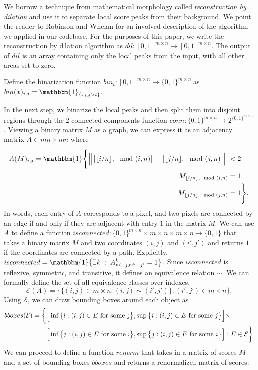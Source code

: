 \documentclass[10pt]{article}
\newcommand{\ind}[1]{\mathbbm{1}_{\left\{#1\right\}}}
\begin{document}
We borrow a technique from mathematical morphology called {\em reconstruction by dilation} and use it to separate local score peaks from their background.
We point the reader to Robinson and Whelan \citep{robinson2004efficient} for an involved description of the algorithm we applied in our codebase.
For the purposes of this paper, we write the reconstruction by dilation algorithm as $dil : [0,1]^{m \times n} \to [0,1]^{m \times n}$.
The output of $dil$ is an array containing only the local peaks from the input, with all other areas set to zero.

Define the binarization function $bin_t: [0,1]^{m \times n} \to \{0,1\}^{m \times n}$ as $bin(x)_{i,j}=\ind{x_{i,j}>t}$.

In the next step, we binarize the local peaks and then split them into disjoint regions through the $2$-connected-components function $conn:\{0,1\}^{m \times n} \to 2^{\{0,1\}^{m \times n}}$.
Viewing a binary matrix $M$ as a graph, we can express it as an adjacency matrix $A \in mn \times mn$ where 
\begin{align}
    A(M)_{i,j} = \mathbbm{1}
    \Bigg\{
        \Big|\Big|\big[ \lfloor i/n \rfloor, \mod (i,n) \big]-\big[ \lfloor j/n \rfloor, \mod (j,n) \big]\Big|\Big| & < 2 \\
        M_{\lfloor i/n \rfloor,\mod (i,n)} & = 1  \\
        M_{\lfloor j/n \rfloor,\mod (j,n)} & = 1 \Bigg\}.
\end{align}
In words, each entry of $A$ corresponds to a pixel, and two pixels are connected by an edge if and only if they are adjacent with entry $1$ in the matrix $M$.
We can use $A$ to define a function $isconnected : \{0,1\}^{m \times n} \times m \times n \times m \times n \to \{0,1\}$ that takes a binary matrix $M$ and two coordinates $(i,j)$ and $(i', j')$ and returns $1$ if the coordinates are connected by a path.
Explicitly, $isconnected = \mathbbm{1}\big\{ \exists k \; : \; A^k_{ni+j,ni'+j'} = 1\big\}$.
Since $isconnected$ is reflexive, symmetric, and transitive, it defines an equivalence relation $\sim$.
We can formally define the set of all equivalence classes over indexes,
\begin{equation}
    \mathcal{E}(A) = \Big\{ \big\{ (i,j) \in m \times n : (i,j) \sim (i',j') \big\} : (i', j') \in m \times n\Big\}.
\end{equation}
Using $\mathcal{E}$, we can draw bounding boxes around each object as
\begin{align}
    bboxes(\mathcal{E}) = \bigg\{ & \Big[ \inf\big\{i : (i,j) \in E \textnormal{ for some } j\big\}, \sup\big\{i : (i,j) \in E \textnormal{ for some } j\big\}\Big] \times \\ 
    & \Big[ \inf\big\{j : (i,j) \in E \textnormal{ for some } i\big\}, \sup\big\{j : (i,j) \in E \textnormal{ for some } i\big\}\Big] : E \in \mathcal{E} \bigg\}
\end{align}
We can proceed to define a function $renorm$ that takes in a matrix of scores $M$ and a set of bounding boxes $bboxes$ and returns a renormalized matrix of scores:
\end{document}

